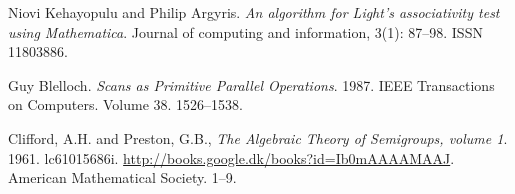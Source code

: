 \begin{thebibliography}{1}


Niovi Kehayopulu and Philip Argyris. \emph{An algorithm for Light's
associativity test using Mathematica}. Journal of computing and information,
3(1): 87--98. ISSN 11803886.


Guy Blelloch. \emph{Scans as Primitive Parallel Operations}. 1987. IEEE
Transactions on Computers. Volume 38. 1526--1538.

Clifford, A.H. and Preston, G.B.,
\emph{The Algebraic Theory of Semigroups, volume 1}. 1961.
lc61015686i. \url{http://books.google.dk/books?id=Ib0mAAAAMAAJ}.
  American Mathematical Society. 1--9.

\end{thebibliography}
